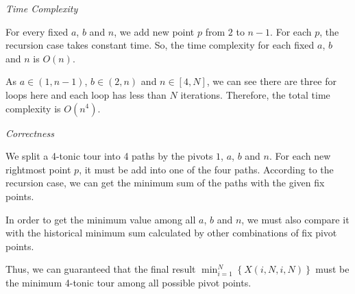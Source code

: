 \documentclass[12pt,letterpaper]{article}
\begin{document}
\medskip\noindent\textit{Time Complexity}\par
For every fixed $a$, $b$ and $n$, we add new point $p$ from $2$ to $n-1$. For each $p$, the recursion case takes constant time. So, the time complexity for each fixed $a$, $b$ and $n$ is $O(n)$.\par
As $a\in(1,n-1)$, $b\in(2,n)$ and $n\in[4,N]$, we can see there are three for loops here and each loop has less than $N$ iterations. Therefore, the total time complexity is $O(n^4)$.\par
\medskip\noindent\textit{Correctness}\par
We split a 4-tonic tour into 4 paths by the pivots $1$, $a$, $b$ and $n$. For each new rightmost point $p$, it must be add into one of the four paths. According to the recursion case, we can get the minimum sum of the paths with the given fix points.\par
In order to get the minimum value among all $a$, $b$ and $n$, we must also compare it with the historical minimum sum calculated by other combinations of fix pivot points.\par
Thus, we can guaranteed that the final result $\min_{i=1}^N\left\{X(i,N,i,N)\right\}$ must be the minimum 4-tonic tour among all possible pivot points.\par
\end{document}
